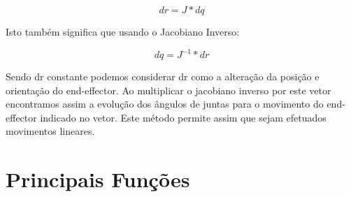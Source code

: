 \documentclass{report}
\begin{document}
\begin{equation}
    dr = J * dq
\end{equation}

Isto também significa que usando o Jacobiano Inverso:

\begin{equation}
    dq = J^{-1} * dr
\end{equation}

Sendo dr constante podemos considerar dr como a alteração da posição e orientação do end-effector. Ao multiplicar o jacobiano inverso por este vetor encontramos assim a evolução dos ângulos de juntas para o movimento do end-effector indicado no vetor. Este método permite assim que sejam efetuados movimentos lineares.
 
\section{Principais Funções}
\end{document}
